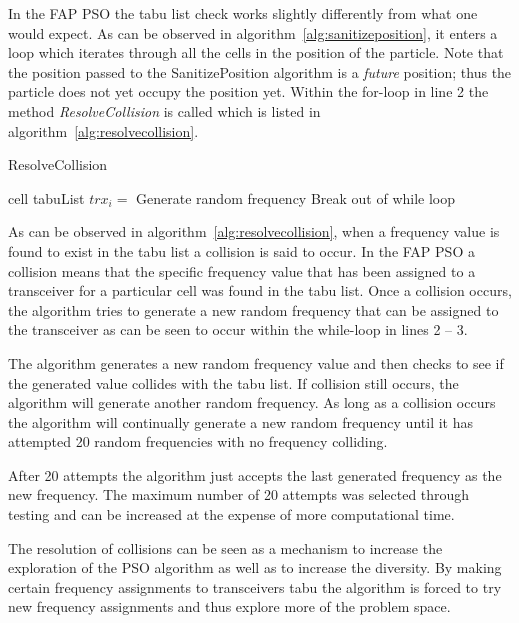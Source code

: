 In the \gls{FAP} \gls{PSO} the tabu list check works slightly differently from what one would expect. As can be observed in algorithm~\ref{alg:sanitizeposition}, it enters a loop which iterates through all the cells in the position of the particle. Note that the position passed to the SanitizePosition algorithm is a \emph{future} position; thus the particle does not yet occupy the position yet. Within the for-loop in line 2 the method \emph{ResolveCollision} is called which is listed in algorithm~\ref{alg:resolvecollision}.

\begin{algorithm}[H]
\caption{ResolveCollision}
\label{alg:resolvecollision}
\begin{algorithmic}[1]
	\Require cell
	\Require tabuList
				\State $trx_i = $ Generate random frequency
					\State Break out of while loop
				\EndIf
			\EndWhile
	\EndFor
\end{algorithmic}
\end{algorithm}

As can be observed in algorithm~\ref{alg:resolvecollision}, when a frequency value is found to exist in the tabu list a collision is said to occur. In the \gls{FAP} \gls{PSO} a collision means that the specific frequency value that has been assigned to a transceiver for a particular cell was found in the tabu list. Once a collision occurs, the algorithm tries to generate a new random frequency that can be assigned to the transceiver as can be seen to occur within the while-loop in lines 2 -- 3.

The algorithm generates a new random frequency value and then checks to see if the generated value collides with the tabu list. If collision still occurs, the algorithm will generate another random frequency. As long as a collision occurs the algorithm will continually generate a new random frequency until it has attempted 20 random frequencies with no frequency colliding. 

After 20 attempts the algorithm just accepts the last generated frequency as the new frequency. The maximum number of 20  attempts was selected through testing and can be increased at the expense of more computational time. 

The resolution of collisions can be seen as a mechanism to increase the exploration of the \gls{PSO} algorithm as well as to increase the diversity. By making certain frequency assignments to transceivers tabu the algorithm is forced to try new frequency assignments and thus explore more of the problem space.

